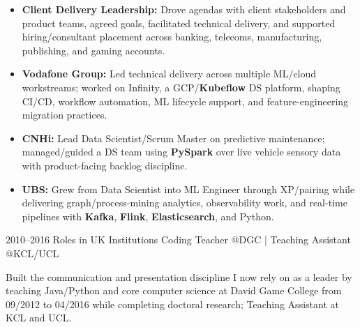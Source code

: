 \documentclass[]{../../friggeri-cv}
\begin{document}
\begin{entrylist}
{{        }
        \begin{itemize}[leftmargin=1.1em]
					            \item \footnotesize\textbf{Client Delivery Leadership:} Drove agendas with client stakeholders and product teams, agreed goals, facilitated technical delivery, and supported hiring/consultant placement across banking, telecoms, manufacturing, publishing, and gaming accounts.
					            \item \footnotesize\textbf{Vodafone Group:} Led technical delivery across multiple ML/cloud workstreams; worked on Infinity, a GCP/\textbf{Kubeflow} DS platform, shaping CI/CD, workflow automation, ML lifecycle support, and feature-engineering migration practices.
				            \item \footnotesize\textbf{CNHi:} Lead Data Scientist/Scrum Master on predictive maintenance; managed/guided a DS team using \textbf{PySpark} over live vehicle sensory data with product-facing backlog discipline.
			            \item \footnotesize\textbf{UBS:} Grew from Data Scientist into ML Engineer through XP/pairing while delivering graph/process-mining analytics, observability work, and real-time pipelines with \textbf{Kafka}, \textbf{Flink}, \textbf{Elasticsearch}, and Python.
	        \end{itemize}
    }
    \entry
    {2010–2016}
    {Roles in UK Institutions}
    {\small Coding Teacher @DGC | Teaching Assistant @KCL/UCL}
    {
        {\small
        \setlength{\parindent}{0pt}
        \setlength{\leftskip}{0pt}
	        Built the communication and presentation discipline I now rely on as a leader by teaching Java/Python and core computer science at David Game College from 09/2012 to 04/2016 while completing doctoral research; Teaching Assistant at KCL and UCL.

	        }
	    }
	\end{entrylist}
	\newpage
	\setlength{\parskip}{2pt}
	\setlength{\parsep}{0pt}
\end{document}
